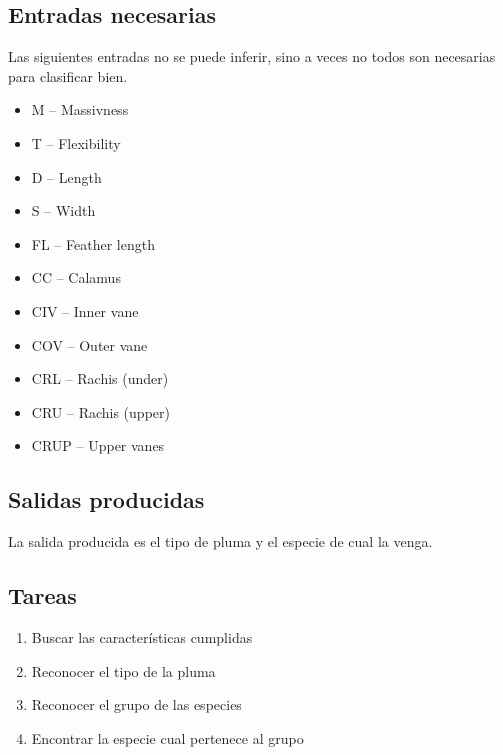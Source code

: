 \documentclass[a4paper,12pt]{article}
\begin{document}
\subsection{Entradas necesarias}
Las siguientes entradas no se puede inferir, sino a veces no todos son necesarias para clasificar bien.
\begin{itemize}
	\item M -- Massivness
	\item T -- Flexibility
	\item D -- Length
	\item S -- Width
	\item FL -- Feather length
	\item CC -- Calamus
	\item CIV -- Inner vane
	\item COV -- Outer vane
	\item CRL -- Rachis (under)
	\item CRU -- Rachis (upper)
	\item CRUP -- Upper vanes
\end{itemize}

\subsection{Salidas producidas}
La salida producida es el tipo de pluma y el especie de cual la venga.

\subsection{Tareas}
\begin{enumerate}
	\item Buscar las características cumplidas
	\item Reconocer el tipo de la pluma
	\item Reconocer el grupo de las especies
	\item Encontrar la especie cual pertenece al grupo
\end{enumerate}
\end{document}

